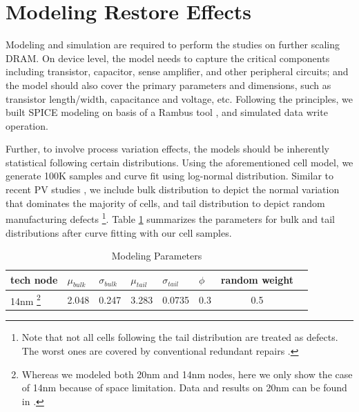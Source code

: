 \section{Modeling Restore Effects}
Modeling and simulation are required to perform the studies on further scaling DRAM. On device level, the model needs to capture the critical components including transistor, capacitor, sense amplifier, and other peripheral circuits; and the model should also cover the primary parameters and dimensions, such as transistor length/width, capacitance and voltage, etc. Following the principles, we built SPICE modeling on basis of a Rambus tool \cite{MICRO10:rambus}, and simulated data write operation. %


Further, to involve process variation effects, the models should be inherently statistical following certain distributions.
Using the aforementioned cell model, we generate 100K samples and curve fit using log-normal distribution. Similar to recent PV studies \cite{ISCA12:raidr,HPCA14:mosaic}, we include bulk distribution to depict the normal variation that dominates the majority of cells, and tail distribution to depict random manufacturing defects
{\footnote{Note that not all cells following the tail distribution are treated as defects. The worst ones are covered by conventional redundant repairs \cite{HPCA14:mosaic}.}}.
Table \ref{tab:tech} summarizes the parameters for bulk and tail distributions after curve fitting with our cell samples. 

\begin{savenotes}
\begin{table}[htbp]
\vspace{-0.2in}
\caption{Modeling Parameters}
\vspace{-0.2in}
\centering
\scalebox{0.85}
{
\begin{tabular}{l|llll|lcc}
\hline
tech node&	$\mu_{bulk}$&	$\sigma_{bulk}$&	$\mu_{tail}$&	$\sigma_{tail}$&	$\phi$&	random weight\\
\hline\hline
14nm \footnote{Whereas we modeled both 20nm and 14nm nodes, here we only show the case of 14nm because of space limitation. Data and results on 20nm can be found in \cite{DATE15:twr}.} &	2.048&	0.247&	3.283&	0.0735&	0.3	&0.5\\
\hline\hline
\end{tabular}
}
\label{tab:tech}
\end{table}
\end{savenotes}

